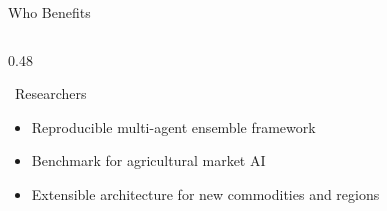\documentclass{beamer}
\begin{document}
\begin{frame}[label=benefits]{Who Benefits}
\begin{columns}[T]
\begin{column}{0.48\textwidth}
\begin{infocard}{~Researchers}
\scriptsize
\begin{itemize}\setlength\itemsep{2pt}
\item Reproducible multi-agent ensemble framework
\item Benchmark for agricultural market AI
\item Extensible architecture for new commodities and regions
\end{itemize}
\end{infocard}

\end{column}
\end{columns}

\end{frame}


\end{document}
